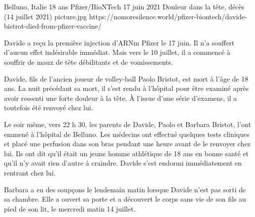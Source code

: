 {Belluno, Italie}
{18 ans}
{Pfizer/BioNTech}
{17 juin 2021}
{Douleur dans la tête, décès (14 juillet 2021)}
{picture.jpg}
{https://nomoresilence.world/pfizer-biontech/davide-bistrot-died-from-pfizer-vaccine/}
{

Davide a reçu la première injection d'ARNm Pfizer le 17 juin. Il n'a souffert
d'aucun effet indésirable immédiat. Mais vers le 10 juillet, il a commencé à
souffrir de maux de tête débilitants et de vomissements.

Davide, fils de l'ancien joueur de volley-ball Paolo Bristot, est mort à l'âge
de 18 ans. La nuit précédant sa mort, il s'est rendu à l'hôpital pour être
examiné après avoir ressenti une forte douleur à la tête. À l'issue d'une série
d'examens, il a toutefois été renvoyé chez lui.

Le soir même, vers 22 h 30, les parents de Davide, Paolo et Barbara Bristot,
l'ont emmené à l'hôpital de Belluno. Les médecins ont effectué quelques tests
cliniques et placé une perfusion dans son bras pendant une heure avant de le
renvoyer chez lui. Ils ont dit qu'il était un jeune homme athlétique de 18 ans
en bonne santé et qu'il n'y avait rien d'autre à craindre. Davide s'est endormi
immédiatement en rentrant chez lui.

Barbara a eu des soupçons le lendemain matin lorsque Davide n'est pas sorti de
sa chambre. Elle a ouvert sa porte et a découvert le corps sans vie de son fils
au pied de son lit, le mercredi matin 14 juillet.

}
